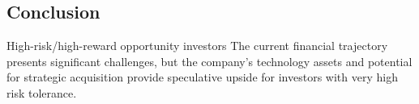 \documentclass[11pt,a4paper]{article}
\begin{document}
\vspace{0.3cm}

\subsection{Conclusion}

\noindent High-risk/high-reward opportunity investors The current financial trajectory presents significant challenges, but the company's technology assets and potential for strategic acquisition provide speculative upside for investors with very high risk tolerance.
\end{document}

